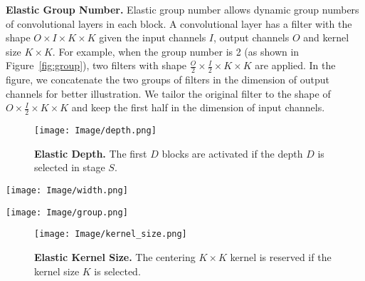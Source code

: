 \documentclass[final]{cvpr}
\begin{document}
\textbf{Elastic Group Number.}
Elastic group number allows dynamic group numbers of convolutional layers in each block. A convolutional layer has a filter with the shape $O \times I \times K \times K$ given the input channels $I$, output channels $O$ and kernel size $K \times K$. For example, when the group number is 2 (as shown in Figure~\ref{fig:group}), two filters with shape $\frac{O}{2} \times \frac{I}{2} \times K \times K$ are applied. In the figure, we concatenate the two groups of filters in the dimension of output channels for better illustration. We tailor the original filter to the shape of $O \times \frac{I}{2} \times K \times K$ and keep the first half in the dimension of input channels.


\begin{figure}[tb]
	\centering
	\texttt{[image: Image/depth.png]}
	\caption{\textbf{Elastic Depth.} The first $D$ blocks are activated if the depth $D$ is selected in stage $S$.}
	\label{fig:depth}
	\vspace{10pt}
\end{figure}

\begin{figure*}[tb]
	\centering
	\texttt{[image: Image/width.png]}
	\caption{\textbf{Elastic Width.} Given the input channels $I$ and kernel size $K \times K$, the first $W$ output channels out of $O$ is kept if the width W is selected. The filter is tailored from the shape $O \times I \times K \times K$ to $W \times I \times K \times K$.}
	\label{fig:width}
	\vspace{10pt}
\end{figure*}


\begin{figure*}[h]
	\centering
	\texttt{[image: Image/group.png]}
	\caption{\textbf{Elastic Group Number.} An example of Group=2 is illustrated in the figure. Given the input channels $I$, output channels $O$, and kernel size $K \times K$, the filter is tailored from the shape $O \times I \times K \times K$ to $O \times \frac{I}{2} \times K \times K$. Two groups of filters with shape $\frac{O}{2} \times \frac{I}{2} \times K \times K$ are applied and are concatenated in the dimension of output channels.}
	\label{fig:group}
	\vspace{10pt}
\end{figure*}


\begin{figure}[tb]
	\centering
	\texttt{[image: Image/kernel\_size.png]}
	\caption{\textbf{Elastic Kernel Size.} The centering $K \times K$ kernel is reserved if the kernel size $K$ is selected.}
	\label{fig:ks}
	\vspace{10pt}
\end{figure}
\end{document}
